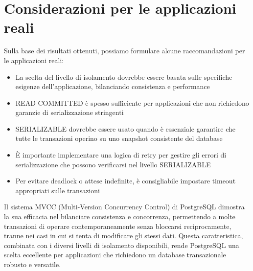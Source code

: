 \documentclass[a4paper,12pt]{report}
\begin{document}
\section{Considerazioni per le applicazioni reali}

Sulla base dei risultati ottenuti, possiamo formulare alcune raccomandazioni per le applicazioni reali:

\begin{itemize}
    \item La scelta del livello di isolamento dovrebbe essere basata sulle specifiche esigenze dell'applicazione, bilanciando consistenza e performance
    \item READ COMMITTED è spesso sufficiente per applicazioni che non richiedono garanzie di serializzazione stringenti
    \item SERIALIZABLE dovrebbe essere usato quando è essenziale garantire che tutte le transazioni operino su uno snapshot consistente del database
    \item È importante implementare una logica di retry per gestire gli errori di serializzazione che possono verificarsi nel livello SERIALIZABLE
    \item Per evitare deadlock o attese indefinite, è consigliabile impostare timeout appropriati sulle transazioni
\end{itemize}

Il sistema MVCC (Multi-Version Concurrency Control) di PostgreSQL dimostra la sua efficacia nel bilanciare consistenza e concorrenza, permettendo a molte transazioni di operare contemporaneamente senza bloccarsi reciprocamente, tranne nei casi in cui si tenta di modificare gli stessi dati. Questa caratteristica, combinata con i diversi livelli di isolamento disponibili, rende PostgreSQL una scelta eccellente per applicazioni che richiedono un database transazionale robusto e versatile.
\end{document}
